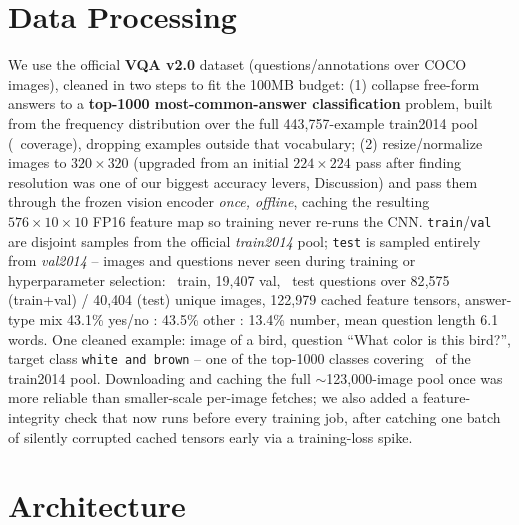 \documentclass[final]{article}
\begin{document}
\section*{Data Processing}

We use the official \textbf{VQA v2.0} dataset (questions/annotations over COCO images), cleaned in
two steps to fit the 100MB budget: (1) collapse free-form answers to a \textbf{top-1000
most-common-answer classification} problem, built from the frequency distribution over the full
443{,}757-example train2014 pool (\vocabCoverage\ coverage), dropping examples outside that
vocabulary; (2) resize/normalize images to $320\times320$ (upgraded from an initial
$224\times224$ pass after finding resolution was one of our biggest accuracy levers, Discussion)
and pass them through the frozen vision encoder \emph{once, offline}, caching the resulting
$576\times10\times10$ FP16 feature map so training never re-runs the CNN. \texttt{train}/\texttt{val} are disjoint samples from the official
\emph{train2014} pool; \texttt{test} is sampled entirely from \emph{val2014} -- images and
questions never seen during training or hyperparameter selection: \trainPoolSize\ train,
19{,}407 val, \testSetSize\ test questions over 82{,}575 (train+val) / 40{,}404 (test) unique
images, 122{,}979 cached feature tensors, answer-type mix 43.1\% yes/no : 43.5\% other : 13.4\%
number, mean question length 6.1 words. One cleaned example: image of a bird, question ``What
color is this bird?'', target class \texttt{white and brown} -- one of the top-1000 classes
covering \vocabCoverage\ of the train2014 pool. Downloading and caching the full
$\sim$123,000-image pool once was more reliable than smaller-scale per-image fetches; we also added
a feature-integrity check that now runs before every training job, after catching one batch of
silently corrupted cached tensors early via a training-loss spike.

\section*{Architecture}
\end{document}
